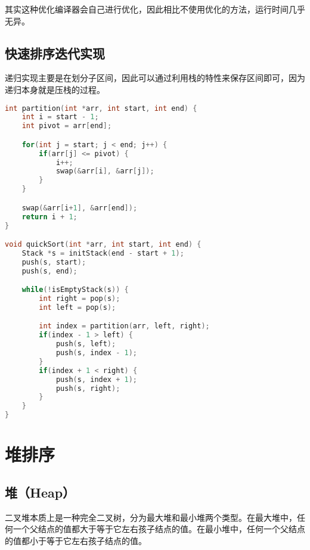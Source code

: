 其实这种优化编译器会自己进行优化，因此相比不使用优化的方法，运行时间几乎无异。

\subsection{快速排序迭代实现}

递归实现主要是在划分子区间，因此可以通过利用栈的特性来保存区间即可，因为递归本身就是压栈的过程。 \\


\begin{lstlisting}[language=C]
int partition(int *arr, int start, int end) {
    int i = start - 1;
    int pivot = arr[end];

    for(int j = start; j < end; j++) {
        if(arr[j] <= pivot) {
            i++;
            swap(&arr[i], &arr[j]);
        }
    }

    swap(&arr[i+1], &arr[end]);
    return i + 1;
}

void quickSort(int *arr, int start, int end) {
    Stack *s = initStack(end - start + 1);
    push(s, start);
    push(s, end);

    while(!isEmptyStack(s)) {
        int right = pop(s);
        int left = pop(s);

        int index = partition(arr, left, right);
        if(index - 1 > left) {
            push(s, left);
            push(s, index - 1);
        }
        if(index + 1 < right) {
            push(s, index + 1);
            push(s, right);
        }
    }
}
\end{lstlisting}

\newpage

\section{堆排序}

\subsection{堆（Heap）}

二叉堆本质上是一种完全二叉树，分为最大堆和最小堆两个类型。在最大堆中，任何一个父结点的值都大于等于它左右孩子结点的值。在最小堆中，任何一个父结点的值都小于等于它左右孩子结点的值。 \\

